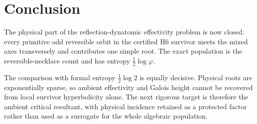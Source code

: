 \section{Conclusion}

The physical part of the reflection-dynatomic effectivity problem is now
closed: every primitive odd reversible orbit in the certified H6 survivor
meets the mixed axes transversely and contributes one simple root.  The exact
population is the reversible-necklace count and has entropy
$\frac12\log\varphi$.

The comparison with formal entropy $\frac12\log2$ is equally decisive.
Physical roots are exponentially sparse, so ambient effectivity and Galois
height cannot be recovered from local survivor hyperbolicity alone.  The
next rigorous target is therefore the ambient critical resultant, with
physical incidence retained as a protected factor rather than used as a
surrogate for the whole algebraic population.
